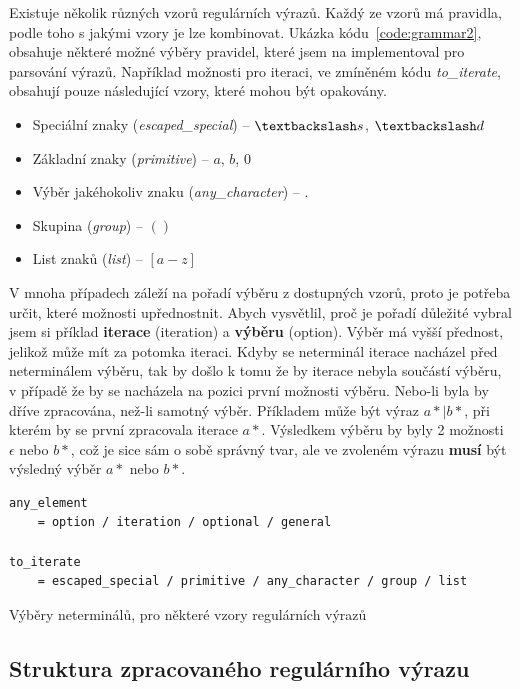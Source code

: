 Existuje několik různých vzorů regulárních výrazů.
Každý ze vzorů má pravidla, podle toho s jakými vzory je lze kombinovat.
Ukázka kódu~\ref{code:grammar2}, obsahuje některé možné výběry pravidel, které jsem na implementoval pro parsování výrazů.
Například možnosti pro iteraci, ve zmíněném kódu \textit{to\_iterate}, obsahují pouze následující vzory, které mohou být opakovány.

\begin{itemize}
	\item Speciální znaky (\textit{escaped\_special}) -- $\textbackslash s$, $\textbackslash d$
	\item Základní znaky (\textit{primitive}) -- $a$, $b$, $0$
	\item Výběr jakéhokoliv znaku (\textit{any\_character}) -- $.$
	\item Skupina (\textit{group}) -- $()$
	\item List znaků (\textit{list}) -- $[a-z]$
\end{itemize}

V mnoha případech záleží na pořadí výběru z dostupných vzorů, proto je potřeba určit, které možnosti upřednostnit.
Abych vysvětlil, proč je pořadí důležité vybral jsem si příklad \textbf{iterace} (iteration) a \textbf{výběru} (option).
Výběr má vyšší přednost, jelikož může mít za potomka iteraci.
Kdyby se neterminál iterace nacházel před neterminálem výběru, tak by došlo k tomu že by iterace nebyla součástí výběru, v případě že by se nacházela na pozici první možnosti výběru. 
Nebo-li byla by dříve zpracována, než-li samotný výběr.
Příkladem může být výraz $a*|b*$, při kterém by se první zpracovala iterace $a*$.
Výsledkem výběru by byly 2 možnosti $\epsilon$ nebo $b*$, což je sice sám o sobě správný tvar, ale ve zvoleném výrazu \textbf{musí} být výsledný výběr $a*$ nebo $b*$.

\begin{code}[!ht]
	\begin{verbatim}
any_element 
	= option / iteration / optional / general

to_iterate
	= escaped_special / primitive / any_character / group / list
	\end{verbatim}
	\caption{Výběry neterminálů, pro některé vzory regulárních výrazů}
	\label{code:grammar2}
\end{code}

\subsection*{Struktura zpracovaného regulárního výrazu}

